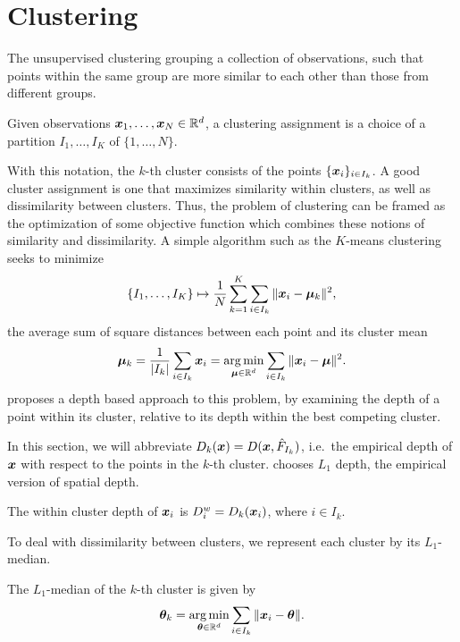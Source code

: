 \section{Clustering}

The unsupervised clustering grouping a collection of observations, such that
points within the same group are more similar to each other than those from
different groups.

\begin{definition}[Clustering]
    Given observations $\bm{x}_1, \dots, \bm{x}_N \in \mathbb{R}^d$, a clustering assignment
    is a choice of a partition $I_1, \dots, I_K$ of $\{1, \dots, N\}$.
\end{definition}

With this notation, the $k$-th cluster consists of the points $\{\bm{x}_i\}_{i
\in I_k}$.
A good cluster assignment is one that maximizes similarity within clusters, as
well as dissimilarity between clusters.
Thus, the problem of clustering can be framed as the optimization of some
objective function which combines these notions of similarity and
dissimilarity.
A simple algorithm such as the $K$-means clustering seeks to minimize
\begin{equation}
    \{I_1, \dots, I_K\} \mapsto \frac{1}{N} \sum_{k = 1}^K \sum_{i \in I_k} \Vert \bm{x}_i - \bm{\mu}_k \Vert^2,
\end{equation}
the average sum of square distances between each point and its cluster mean
\begin{equation}
    \bm{\mu}_k = \frac{1}{|I_k|} \sum_{i \in I_k} \bm{x}_i
    = \operatorname*{arg\,min}_{\bm{\mu} \in \mathbb{R}^d} \sum_{i \in I_k} \Vert \bm{x}_i - \bm{\mu} \Vert^2.
\end{equation}
\textcite{jornsten-2004} proposes a depth based approach to this problem, by
examining the depth of a point within its cluster, relative to its depth
within the best competing cluster.

In this section, we will abbreviate $D_k(\bm{x}) = D(\bm{x}, \hat{F}_{I_k})$, i.e.\
the empirical depth of $\bm{x}$ with respect to the points in the $k$-th cluster.
\textcite{jornsten-2004} chooses $L_1$ depth, the empirical version of spatial
depth.

\begin{definition}
    The within cluster depth of $\bm{x}_i$ is $D_i^w = D_k(\bm{x}_i)$, where $i \in
    I_k$.
\end{definition}

To deal with dissimilarity between clusters, we represent each cluster by its
$L_1$-median.

\begin{definition}[$L_1$-median]
    The $L_1$-median of the $k$-th cluster is given by
    \begin{equation}
        \bm{\theta}_k = \operatorname*{arg\,min}_{\bm{\theta} \in \mathbb{R}^d} \sum_{i \in I_k} \Vert \bm{x}_i - \bm{\theta} \Vert.
    \end{equation}
\end{definition}

